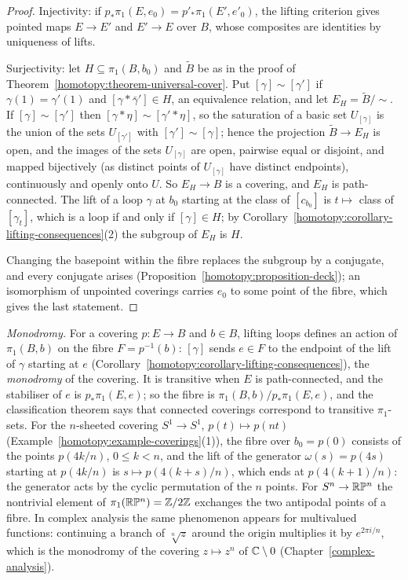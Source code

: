 \begin{proof}
Injectivity: if $p_*\pi_1(E, e_0) = p'_*\pi_1(E', e'_0)$, the lifting criterion gives pointed maps $E \to E'$ and $E' \to E$ over $B$, whose composites are identities by
uniqueness of lifts.

Surjectivity: let $H \subseteq \pi_1(B, b_0)$ and $\tilde{B}$ be as in the proof of Theorem~\ref{homotopy:theorem-universal-cover}. Put $[\gamma] \sim [\gamma']$ if
$\gamma(1) = \gamma'(1)$ and $[\gamma * \bar\gamma'] \in H$, an equivalence relation, and let $E_H = \tilde{B}/{\sim}$. If $[\gamma] \sim [\gamma']$ then
$[\gamma * \eta] \sim [\gamma' * \eta]$, so the saturation of a basic set $U_{[\gamma]}$ is the union of the sets $U_{[\gamma']}$ with $[\gamma'] \sim [\gamma]$; hence the
projection $\tilde{B} \to E_H$ is open, and the images of the sets $U_{[\gamma]}$ are open, pairwise equal or disjoint, and mapped bijectively (as distinct points of
$U_{[\gamma]}$ have distinct endpoints), continuously and openly onto $U$. So $E_H \to B$ is a covering, and $E_H$ is path-connected. The lift of a loop $\gamma$ at $b_0$
starting at the class of $[c_{b_0}]$ is $t \mapsto$ class of $[\gamma_t]$, which is a loop if and only if $[\gamma] \in H$; by
Corollary~\ref{homotopy:corollary-lifting-consequences}(2) the subgroup of $E_H$ is $H$.

Changing the basepoint within the fibre replaces the subgroup by a conjugate, and every conjugate arises (Proposition~\ref{homotopy:proposition-deck}); an
isomorphism of unpointed coverings carries $e_0$ to some point of the fibre, which gives the last statement.
\end{proof}

\begin{example}\label{homotopy:example-monodromy}
\emph{Monodromy.} For a covering $p \colon E \to B$ and $b \in B$, lifting loops defines an action of $\pi_1(B, b)$ on the fibre $F = p^{-1}(b)$: $[\gamma]$ sends $e \in F$ to the endpoint of the lift of
$\gamma$ starting at $e$ (Corollary~\ref{homotopy:corollary-lifting-consequences}), the \emph{monodromy} of the covering. It is transitive when $E$ is path-connected, and the stabiliser of $e$ is
$p_*\pi_1(E, e)$; so the fibre is $\pi_1(B, b)/p_*\pi_1(E, e)$, and the classification theorem says that connected coverings correspond to transitive $\pi_1$-sets. For the $n$-sheeted covering
$S^1 \to S^1$, $p(t) \mapsto p(nt)$ (Example~\ref{homotopy:example-coverings}(1)), the fibre over $b_0 = p(0)$ consists of the points $p(4k/n)$, $0 \leq k < n$, and the lift of the generator
$\omega(s) = p(4s)$ starting at $p(4k/n)$ is $s \mapsto p(4(k + s)/n)$, which ends at $p(4(k + 1)/n)$: the generator acts by the cyclic permutation of the $n$ points. For $S^n \to \mathbb{R}\mathbb{P}^n$ the nontrivial
element of $\pi_1(\mathbb{R}\mathbb{P}^n) = \mathbb{Z}/2\mathbb{Z}$ exchanges the two antipodal points of a fibre. In complex analysis the same phenomenon appears for multivalued functions: continuing a branch of $\sqrt[n]{z}$
around the origin multiplies it by $e^{2\pi i/n}$, which is the monodromy of the covering $z \mapsto z^n$ of $\mathbb{C} \setminus 0$ (Chapter~\ref{complex-analysis}).
\end{example}

